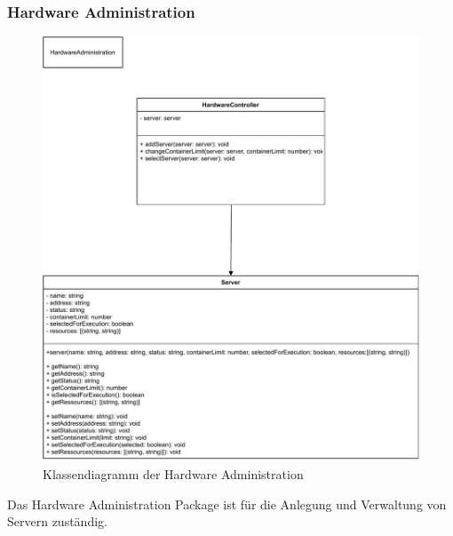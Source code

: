 \subsubsection{Hardware Administration}
\begin{figure}[H]
    \includegraphics[width=1\textwidth]{res/HardwareAdministration.pdf}
    \caption{Klassendiagramm der Hardware Administration}
\end{figure}
Das Hardware Administration Package ist für die Anlegung und Verwaltung von Servern zuständig.

